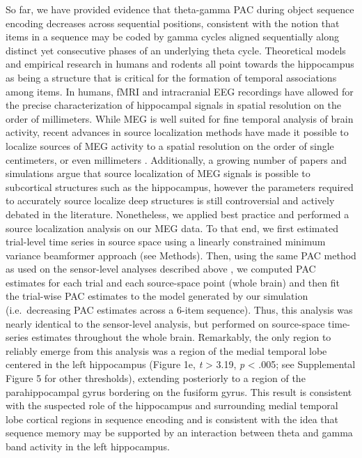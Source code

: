 So far, we have provided evidence that theta-gamma PAC during object
sequence encoding decreases across sequential positions, consistent with
the notion that items in a sequence may be coded by gamma cycles aligned
sequentially along distinct yet consecutive phases of an underlying
theta cycle. Theoretical models
\autocites{jensen_hippocampal_1996}{jensen_hippocampal_2005} and
empirical research in humans
\autocites{dubrow_temporal_2014}{hsieh_hippocampal_2014}{jenkins_prefrontal_2010}{tubridy_medial_2011}{davachi_how_2015}{ezzyat_similarity_2014}
and rodents \autocites{fortin_critical_2002}{kesner_role_2002} all point
towards the hippocampus as being a structure that is critical for the
formation of temporal associations among items. In humans, fMRI and
intracranial EEG recordings have allowed for the precise
characterization of hippocampal signals in spatial resolution on the
order of millimeters. While MEG is well suited for fine temporal
analysis of brain activity, recent advances in source localization
methods have made it possible to localize sources of MEG activity to a
spatial resolution on the order of single centimeters, or even
millimeters \autocite{dalal_spatial_2007}. Additionally, a growing
number of papers
\autocites{attal_assessment_2013}{dalal_simultaneous_2013}{staudigl_theta_2013}
and simulations \autocites{mills_techniques_2012}{quraan_detection_2011}
argue that source localization of MEG signals is possible to subcortical
structures such as the hippocampus, however the parameters required to
accurately source localize deep structures is still controversial and
actively debated in the literature. Nonetheless, we applied best
practice and performed a source localization analysis on our MEG data.
To that end, we first estimated trial-level time series in source space
using a linearly constrained minimum variance beamformer approach (see
Methods). Then, using the same PAC method as used on the sensor-level
analyses described above
\autocites{tort_measuring_2010}{tort_thetagamma_2009}, we computed PAC
estimates for each trial and each source-space point (whole brain) and
then fit the trial-wise PAC estimates to the model generated by our
simulation (i.e.~decreasing PAC estimates across a 6-item sequence).
Thus, this analysis was nearly identical to the sensor-level analysis,
but performed on source-space time-series estimates throughout the whole
brain. Remarkably, the only region to reliably emerge from this analysis
was a region of the medial temporal lobe centered in the left
hippocampus (Figure 1e, \emph{t} \textgreater{} 3.19, \emph{p}
\textless{} .005; see Supplemental Figure 5 for other thresholds),
extending posteriorly to a region of the parahippocampal gyrus bordering
on the fusiform gyrus. This result is consistent with the suspected role
of the hippocampus and surrounding medial temporal lobe cortical regions
in sequence encoding
\autocites{dubrow_temporal_2014}{hsieh_hippocampal_2014}{jenkins_prefrontal_2010}{tubridy_medial_2011}
and is consistent with the idea that sequence memory may be supported by
an interaction between theta and gamma band activity in the left
hippocampus.

